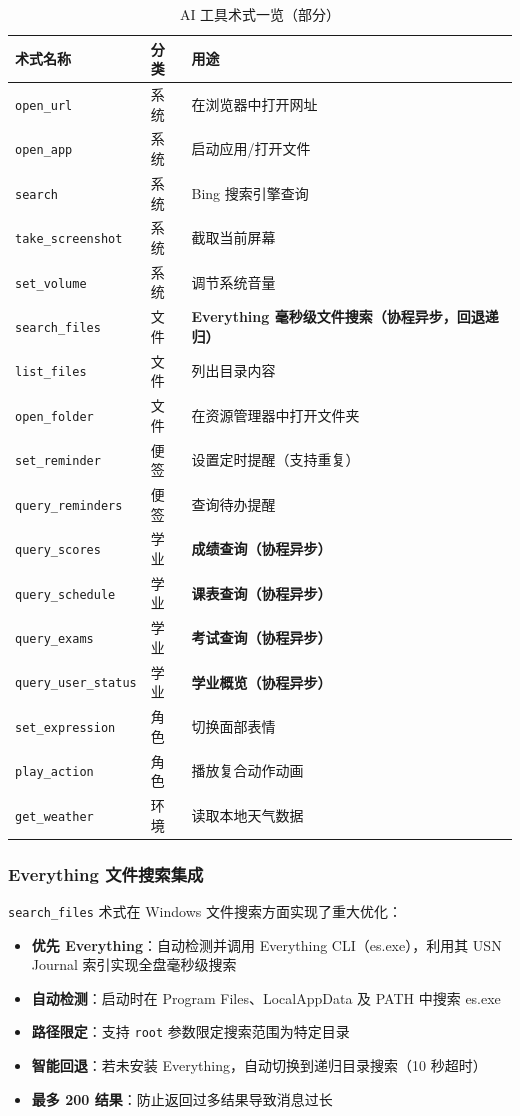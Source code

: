 \documentclass[12pt,a4paper]{ctexart}
\begin{document}
\begin{table}[H]
\centering
\caption{AI 工具术式一览（部分）}
\label{tab:ai-data-tools}
\begin{tabular}{lll}
\toprule
\textbf{术式名称} & \textbf{分类} & \textbf{用途} \\
\midrule
\texttt{open\_url} & 系统 & 在浏览器中打开网址 \\
\texttt{open\_app} & 系统 & 启动应用/打开文件 \\
\texttt{search} & 系统 & Bing 搜索引擎查询 \\
\texttt{take\_screenshot} & 系统 & 截取当前屏幕 \\
\texttt{set\_volume} & 系统 & 调节系统音量 \\
\texttt{search\_files} & 文件 & \textbf{Everything 毫秒级文件搜索（协程异步，回退递归）} \\
\texttt{list\_files} & 文件 & 列出目录内容 \\
\texttt{open\_folder} & 文件 & 在资源管理器中打开文件夹 \\
\texttt{set\_reminder} & 便签 & 设置定时提醒（支持重复） \\
\texttt{query\_reminders} & 便签 & 查询待办提醒 \\
\texttt{query\_scores} & 学业 & \textbf{成绩查询（协程异步）} \\
\texttt{query\_schedule} & 学业 & \textbf{课表查询（协程异步）} \\
\texttt{query\_exams} & 学业 & \textbf{考试查询（协程异步）} \\
\texttt{query\_user\_status} & 学业 & \textbf{学业概览（协程异步）} \\
\texttt{set\_expression} & 角色 & 切换面部表情 \\
\texttt{play\_action} & 角色 & 播放复合动作动画 \\
\texttt{get\_weather} & 环境 & 读取本地天气数据 \\
\bottomrule
\end{tabular}
\end{table}

\subsubsection{Everything 文件搜索集成}

\texttt{search\_files} 术式在 Windows 文件搜索方面实现了重大优化：

\begin{itemize}
    \item \textbf{优先 Everything}：自动检测并调用 Everything CLI（es.exe），利用其 USN Journal 索引实现全盘毫秒级搜索
    \item \textbf{自动检测}：启动时在 Program Files、LocalAppData 及 PATH 中搜索 es.exe
    \item \textbf{路径限定}：支持 \texttt{root} 参数限定搜索范围为特定目录
    \item \textbf{智能回退}：若未安装 Everything，自动切换到递归目录搜索（10 秒超时）
    \item \textbf{最多 200 结果}：防止返回过多结果导致消息过长
\end{itemize}
\end{document}
